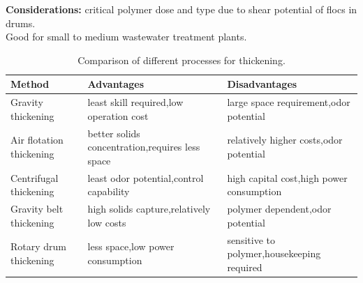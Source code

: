 \documentclass{article}
\numberwithin{equation}{section}
\begin{document}
\textbf{Considerations:} critical polymer dose and type due to shear potential of flocs in drums.\\
Good for small to medium wastewater treatment plants.
\begin{table}[htbp]
\centering
\caption{Comparison of different processes for thickening.}
\label{tab:thickening_methods}
\begin{tabular}{p{4cm}p{5cm}p{5cm}}
\toprule
\textbf{Method} & \textbf{Advantages} & \textbf{Disadvantages} \\
\midrule
Gravity thickening & least skill required,\newline low operation cost & large space requirement,\newline odor potential \\
Air flotation thickening & better solids concentration,\newline requires less space & relatively higher costs,\newline odor potential \\
Centrifugal thickening & least odor potential,\newline control capability & high capital cost,\newline high power consumption \\
Gravity belt thickening & high solids capture,\newline relatively low costs & polymer dependent,\newline odor potential \\
Rotary drum thickening & less space,\newline low power consumption & sensitive to polymer,\newline housekeeping required \\
\bottomrule
\end{tabular}
\end{table}
\end{document}
